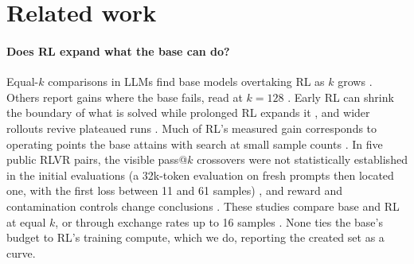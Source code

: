 \section{Related work}
\label{sec:related}

\paragraph{Does RL expand what the base can do?} Equal-$k$ comparisons in LLMs find base models overtaking RL as $k$
grows \citep{yue2025doesrl}. Others report gains where the base fails, read at $k=128$ \citep{liu2025prorl}. Early RL can
shrink the boundary of what is solved while prolonged RL expands it \citep{yao2025twostage}, and wider rollouts revive
plateaued runs \citep{hu2025brorl}. Much of RL's measured gain corresponds to operating points the base attains with
search at small sample counts \citep{sun2026budgeted}. In five public RLVR pairs, the visible pass@$k$ crossovers were not statistically
established \rv{} in the initial evaluations (a 32k-token evaluation on fresh prompts then located one, with the first
loss between 11 and 61 samples) \citep{yang2026kernel}, and reward and contamination controls change conclusions
\citep{shao2025spurious,wu2025contamination}. These studies compare base and RL at equal $k$, or through exchange rates
up to 16 samples \citep{sun2026budgeted}. None ties the base's budget to RL's training compute, which we do, reporting
the created set as a curve.

